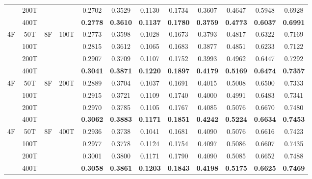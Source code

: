 \begin{table}[t]
\begin{tabular}{@{}c@{\hspace{3pt}}c@{\hspace{6pt}}c@{\hspace{3pt}}c@{\hspace{6pt}}*{7}{c@{\hspace{3pt}}}c@{}}
                    & 200T &                      &                       & 0.2702 & 0.3529 & 0.1130 & 0.1734 & 0.3607 & 0.4647 & 0.5948 & 0.6928 \\
                    & 400T &                      &                       & \textbf{0.2778} & \textbf{0.3610} & \textbf{0.1137} & \textbf{0.1780} & \textbf{0.3759} & \textbf{0.4773} & \textbf{0.6037} & \textbf{0.6991} \\
\midrule
\multirow{4}{*}{4F} & 50T  & \multirow{4}{*}{8F} & \multirow{4}{*}{100T} & 0.2773 & 0.3598 & 0.1028 & 0.1673 & 0.3793 & 0.4817 & 0.6322 & 0.7169 \\
                    & 100T &                      &                       & 0.2815 & 0.3612 & 0.1065 & 0.1683 & 0.3877 & 0.4851 & 0.6233 & 0.7122 \\
                    & 200T &                      &                       & 0.2907 & 0.3709 & 0.1107 & 0.1752 & 0.3993 & 0.4962 & 0.6447 & 0.7292 \\
                    & 400T &                      &                       & \textbf{0.3041} & \textbf{0.3871} & \textbf{0.1220} & \textbf{0.1897} & \textbf{0.4179} & \textbf{0.5169} & \textbf{0.6474} & \textbf{0.7357} \\
\midrule
\multirow{4}{*}{4F} & 50T  & \multirow{4}{*}{8F} & \multirow{4}{*}{200T} & 0.2889 & 0.3704 & 0.1037 & 0.1691 & 0.4015 & 0.5008 & 0.6500 & 0.7333 \\
                    & 100T &                      &                       & 0.2915 & 0.3721 & 0.1109 & 0.1740 & 0.4000 & 0.4991 & 0.6483 & 0.7341 \\
                    & 200T &                      &                       & 0.2970 & 0.3785 & 0.1105 & 0.1767 & 0.4085 & 0.5076 & 0.6670 & 0.7480 \\
                    & 400T &                      &                       & \textbf{0.3062} & \textbf{0.3883} & \textbf{0.1171} & \textbf{0.1851} & \textbf{0.4242} & \textbf{0.5224} & \textbf{0.6634} & \textbf{0.7453} \\
\midrule
\multirow{4}{*}{4F} & 50T  & \multirow{4}{*}{8F} & \multirow{4}{*}{400T} & 0.2936 & 0.3738 & 0.1041 & 0.1681 & 0.4090 & 0.5076 & 0.6616 & 0.7423 \\
                    & 100T &                      &                       & 0.2977 & 0.3778 & 0.1124 & 0.1754 & 0.4097 & 0.5086 & 0.6607 & 0.7435 \\
                    & 200T &                      &                       & 0.3001 & 0.3800 & 0.1171 & 0.1790 & 0.4090 & 0.5085 & 0.6652 & 0.7488 \\
                    & 400T &                      &                       & \textbf{0.3058} & \textbf{0.3861} & \textbf{0.1203} & \textbf{0.1843} & \textbf{0.4198} & \textbf{0.5175} & \textbf{0.6625} & \textbf{0.7469} \\
\bottomrule
\end{tabular}
\end{table}

